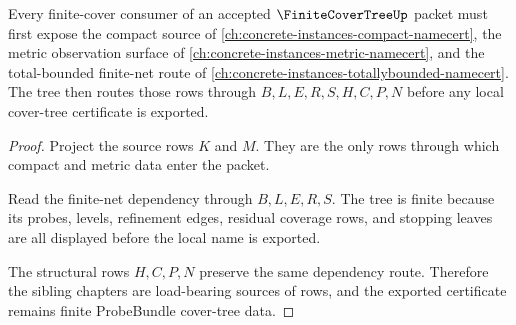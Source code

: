 \begin{theorem}
\label{thm:finite-cover-tree-sibling-dependency}
Every finite-cover consumer of an accepted $\FiniteCoverTreeUp$ packet must first expose the compact source of \autoref{ch:concrete-instances-compact-namecert}, the metric observation surface of \autoref{ch:concrete-instances-metric-namecert}, and the total-bounded finite-net route of \autoref{ch:concrete-instances-totallybounded-namecert}. The tree then routes those rows through $B,L,E,R,S,H,C,P,N$ before any local cover-tree certificate is exported.
\end{theorem}
\begin{proof}
Project the source rows $K$ and $M$. They are the only rows through which compact and metric data enter the packet.

Read the finite-net dependency through $B,L,E,R,S$. The tree is finite because its probes, levels, refinement edges, residual coverage rows, and stopping leaves are all displayed before the local name is exported.

The structural rows $H,C,P,N$ preserve the same dependency route. Therefore the sibling chapters are load-bearing sources of rows, and the exported certificate remains finite ProbeBundle cover-tree data.
\end{proof}

